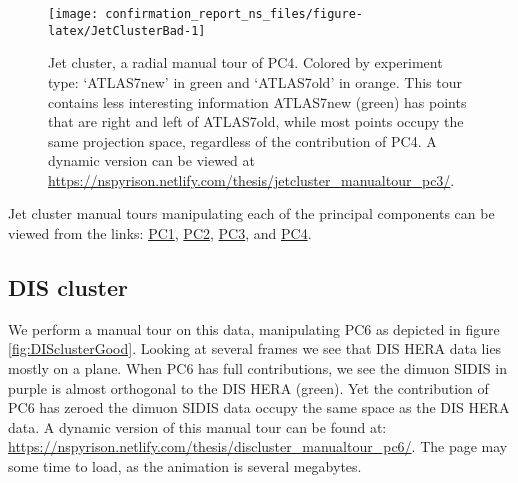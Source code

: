 \documentclass{monashthesis}
\begin{document}
\begin{figure}

{\centering \texttt{[image: confirmation\_report\_ns\_files/figure-latex/JetClusterBad-1]} 

}

\caption{Jet cluster, a radial manual tour of PC4.
Colored by experiment type: `ATLAS7new' in green and `ATLAS7old' in
orange. This tour contains less interesting information ATLAS7new
(green) has points that are right and left of ATLAS7old, while most
points occupy the same projection space, regardless of the contribution
of PC4. A dynamic version can be viewed at
\url{https://nspyrison.netlify.com/thesis/jetcluster_manualtour_pc3/}.}\label{fig:JetClusterBad}
\end{figure}

Jet cluster manual tours manipulating each of the principal components
can be viewed from the links:
\href{https://nspyrison.netlify.com/thesis/jetcluster_manualtour_pc1/}{PC1},
\href{https://nspyrison.netlify.com/thesis/jetcluster_manualtour_pc2/}{PC2},
\href{https://nspyrison.netlify.com/thesis/jetcluster_manualtour_pc3/}{PC3},
and
\href{https://nspyrison.netlify.com/thesis/jetcluster_manualtour_pc4/}{PC4}.

\subsection{DIS cluster}\label{dis-cluster}

We perform a manual tour on this data, manipulating PC6 as depicted in
figure \ref{fig:DISclusterGood}. Looking at several frames we see that
DIS HERA data lies mostly on a plane. When PC6 has full contributions,
we see the dimuon SIDIS in purple is almost orthogonal to the DIS HERA
(green). Yet the contribution of PC6 has zeroed the dimuon SIDIS data
occupy the same space as the DIS HERA data. A dynamic version of this
manual tour can be found at:
\url{https://nspyrison.netlify.com/thesis/discluster_manualtour_pc6/}.
The page may some time to load, as the animation is several megabytes.
\end{document}
